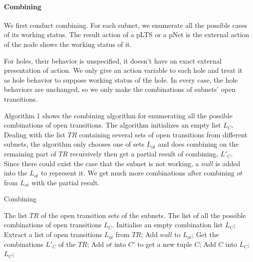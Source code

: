 \documentclass{lncs/llncs}
\begin{document}
\paragraph{Combining}

We first conduct combining. For each subnet, we enumerate all the
possible cases of its working status. The result action of a pLTS or a
pNet is the external action of the node shows the working status of
it.

For holes, their behavior is unspecified, it doesn't have an exact
external presentation of action. We only give an action variable to each hole
and treat it as hole behavior to suppose working status of the
hole.
In every case, the hole behaviors are unchanged, so we
only make the combinations of subnets' open transitions. 

Algorithm 1 shows the combining algorithm for enumerating all the possible combinations of open transitions. The algorithm initializes an empty list $L_C$. Dealing with the list $TR$ containing several sets of open transitions from different subnets, the algorithm only chooses one of sets $L_{ot}$ and does combining on the remaining part of $TR$ recursively then get a partial result of combining, $L'_C$. Since there could exist the case that the subnet is not working, a $null$ is added into the $L_{ot}$ to represent it. We get much more combinations after combining $ot$ from $L_{ot}$ with the partial result. 


\begin{algorithm}
\caption{Combining}
\begin{algorithmic}[1]

\Require The list $TR$ of the open transition sets of the subnets. 
\Ensure The list of all the possible combinations of open transitions $L_C$.
\State Initialise an empty combination list $L_C$;
\State Extract a list of open transitions $L_{ot}$ from $TR$;
\State Add $null$ to $L_{ot}$;
\State Get the combinations $L'_C$ of the $TR$;
		\State Add $ot$ into $C'$ to get a new tuple $C$;
		\State Add $C$ into $L_C$;
	\EndFor
\EndFor 
\State \Return $L_C$;

\end{algorithmic}  
\end{algorithm}
\end{document}
